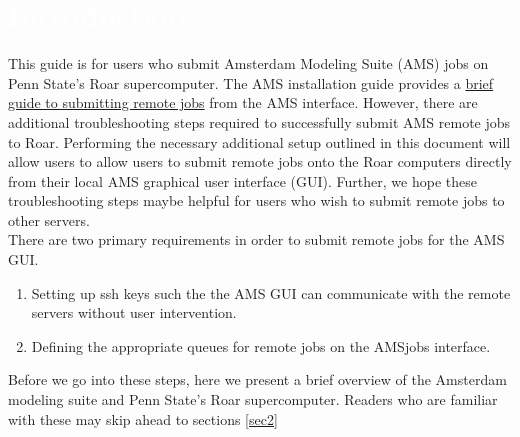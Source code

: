 \section{\textcolor{white}{Introduction}\label{sec:intro}}

This guide is for users who submit Amsterdam Modeling Suite (AMS) jobs on Penn State's Roar supercomputer. 
The AMS installation guide provides a \href{https://www.scm.com/doc/GUI/Set_up.html#running-remotely}{brief guide to submitting remote jobs} from the AMS interface.
However, there are additional troubleshooting steps required to successfully submit AMS remote jobs to Roar. 
Performing the necessary additional setup outlined in this document will allow users to allow users to submit remote jobs onto the Roar computers directly from their local AMS graphical user interface (GUI). 
Further, we hope these troubleshooting steps maybe helpful for users who wish to submit remote jobs to other servers. \\
There are two primary requirements in order to submit remote jobs for the AMS GUI.
\begin{enumerate}
    \item Setting up ssh keys such the the AMS GUI can communicate with the remote servers without user intervention.
    \item Defining the appropriate queues for remote jobs on the AMSjobs interface.
\end{enumerate}
Before we go into these steps, here we present a brief overview of the Amsterdam modeling suite and Penn State's Roar supercomputer. 
Readers who are familiar with these may skip ahead to sections \ref{sec2}

